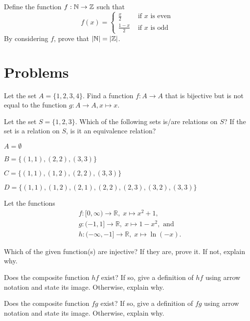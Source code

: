 \begin{exercise}
    Define the function $f: \mathbb{N} \to \mathbb{Z}$ such that
    \[
        f(x) = \begin{cases}
            \frac{x}{2} & \text{ if } x \text{ is even}\\
            \frac{1-x}{2} & \text{ if } x \text{ is odd}
        \end{cases}
    \]
    By considering $f$, prove that $|\mathbb{N}| = |\mathbb{Z}|$.
\end{exercise}

\newpage

\section{Problems}
\begin{problem}
    Let the set $A = \{1, 2, 3, 4\}$. Find a function $f: A \to A$ that is bijective but is not equal to the function $g: A \to A, x \mapsto x$.
\end{problem}

\begin{problem}
    Let the set $S = \{1, 2, 3\}$. Which of the following sets is/are relations on $S$? If the set is a relation on $S$, is it an equivalence relation?
    \begin{partquestions}{\alph*}
        \item $A = \emptyset$
        \item $B = \{(1, 1), (2, 2), (3, 3)\}$
        \item $C = \{(1, 1), (1, 2), (2, 2), (3, 3)\}$
        \item $D = \{(1, 1), (1, 2), (2, 1), (2, 2), (2, 3), (3, 2), (3, 3)\}$
    \end{partquestions}
\end{problem}

\begin{problem}
    Let the functions
    \begin{align*}
        &f: [0, \infty) \to \mathbb{R},\; x\mapsto x^2+1,\\
        &g: (-1, 1] \to \mathbb{R},\; x\mapsto 1-x^2, \text{ and}\\
        &h: (-\infty, -1] \to \mathbb{R},\; x\mapsto \ln(-x).
    \end{align*}
    \begin{partquestions}{\alph*}
        \item Which of the given function(s) are injective? If they are, prove it. If not, explain why.
        \item Does the composite function $hf$ exist? If so, give a definition of $hf$ using arrow notation and state its image. Otherwise, explain why.
        \item Does the composite function $fg$ exist? If so, give a definition of $fg$ using arrow notation and state its image. Otherwise, explain why.
    \end{partquestions}
\end{problem}

